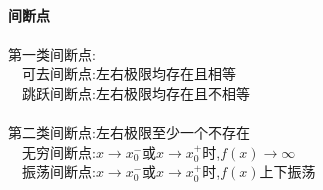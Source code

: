 \documentclass{article}
\begin{document}
\begin{flushleft}
	~\\ \textbf{间断点}\\~\\
	
	第一类间断点:\\
	\ \ 可去间断点:左右极限均存在且相等\\
	\ \ 跳跃间断点:左右极限均存在且不相等\\
	~\\
	第二类间断点:左右极限至少一个不存在\\
	\ \ 无穷间断点:$x\to x_0^-$或$x\to x_0^+$时,$f(x)\to \infty$\\
	\ \ 振荡间断点:$x\to x_0^-$或$x\to x_0^+$时,$f(x)$上下振荡\\

\end{flushleft}
\end{document}
